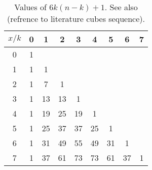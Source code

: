 \begin{table}[H]
    \begin{center}
        \setlength\extrarowheight{-6pt}
        \begin{tabular}{c|cccccccc}
            $x/k$ & 0 & 1  & 2  & 3  & 4  & 5  & 6  & 7 \\ [3px]
            \hline
            0     & 1 &    &    &    &    &    &    &   \\
            1     & 1 & 1  &    &    &    &    &    &   \\
            2     & 1 & 7  & 1  &    &    &    &    &   \\
            3     & 1 & 13 & 13 & 1  &    &    &    &   \\
            4     & 1 & 19 & 25 & 19 & 1  &    &    &   \\
            5     & 1 & 25 & 37 & 37 & 25 & 1  &    &   \\
            6     & 1 & 31 & 49 & 55 & 49 & 31 & 1  &   \\
            7     & 1 & 37 & 61 & 73 & 73 & 61 & 37 & 1 \\
        \end{tabular}
    \end{center}
    \caption{Values of $6k(n-k) + 1$. See also (refrence to literature cubes sequence).}
    \label{tab:fig_1}
\end{table}